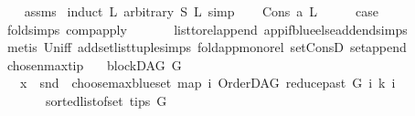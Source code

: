 \begin{isabellebody}
%
\isadelimproof
\ \ %
\endisadelimproof
%
\isatagproof
{}\isamarkupfalse%
\ assms\ \isanewline
{}\isamarkupfalse%
{\isacharparenleft}{\kern0pt}induct\ L{}\ arbitrary{\isacharcolon}{\kern0pt}\ S\ L{}{\isacharcomma}{\kern0pt}\ simp{\isacharparenright}{\kern0pt}\isanewline
\ \ \isamarkupfalse%
\ {\isacharparenleft}{\kern0pt}Cons\ a\ L{}{\isacharparenright}{\kern0pt}\isanewline
\ \ \isamarkupfalse%
\ \isamarkupfalse%
\ {\isacharquery}{\kern0pt}case\ \isanewline
\ \ \ \ \isamarkupfalse%
\ fold{\isachardot}{\kern0pt}simps{\isacharparenleft}{\kern0pt}{}{\isacharparenright}{\kern0pt}\ comp{\isacharunderscore}{\kern0pt}apply\ \isanewline
\ \ \ \ \isamarkupfalse%
\ list{\isacharunderscore}{\kern0pt}to{\isacharunderscore}{\kern0pt}rel{\isacharunderscore}{\kern0pt}append\ app{\isacharunderscore}{\kern0pt}if{\isacharunderscore}{\kern0pt}blue{\isacharunderscore}{\kern0pt}else{\isacharunderscore}{\kern0pt}add{\isacharunderscore}{\kern0pt}end{\isachardot}{\kern0pt}simps\isanewline
\ \ \ \ \isamarkupfalse%
\ {\isacharparenleft}{\kern0pt}metis\ Un{\isacharunderscore}{\kern0pt}iff\ add{\isacharunderscore}{\kern0pt}set{\isacharunderscore}{\kern0pt}list{\isacharunderscore}{\kern0pt}tuple{\isachardot}{\kern0pt}simps\ fold{\isacharunderscore}{\kern0pt}app{\isacharunderscore}{\kern0pt}mono{\isacharunderscore}{\kern0pt}rel\ set{\isacharunderscore}{\kern0pt}ConsD\ set{\isacharunderscore}{\kern0pt}append{\isacharparenright}{\kern0pt}\ \ \isanewline
{}\isamarkupfalse%
%
\endisatagproof
{\isafoldproof}%
%
\isadelimproof
\isanewline
%
\endisadelimproof
\isanewline
{}\isamarkupfalse%
\ chosen{\isacharunderscore}{\kern0pt}max{\isacharunderscore}{\kern0pt}tip{\isacharcolon}{\kern0pt}\isanewline
\ \ \ {\isachardoublequoteopen}blockDAG\ G{\isachardoublequoteclose}\isanewline
\ \ \ {\isachardoublequoteopen}x\ {\isacharequal}{\kern0pt}\ snd\ {\isacharparenleft}{\kern0pt}\ choose{\isacharunderscore}{\kern0pt}max{\isacharunderscore}{\kern0pt}blue{\isacharunderscore}{\kern0pt}set\ {\isacharparenleft}{\kern0pt}map\ {\isacharparenleft}{\kern0pt}{\isasymlambda}i{\isachardot}{\kern0pt}\ {\isacharparenleft}{\kern0pt}OrderDAG\ {\isacharparenleft}{\kern0pt}reduce{\isacharunderscore}{\kern0pt}past\ G\ i{\isacharparenright}{\kern0pt}\ k{\isacharcomma}{\kern0pt}\ i{\isacharparenright}{\kern0pt}{\isacharparenright}{\kern0pt}\isanewline
\ \ \ \ \ \ \ {\isacharparenleft}{\kern0pt}sorted{\isacharunderscore}{\kern0pt}list{\isacharunderscore}{\kern0pt}of{\isacharunderscore}{\kern0pt}set\ {\isacharparenleft}{\kern0pt}tips\ G{\isacharparenright}{\kern0pt}{\isacharparenright}{\kern0pt}{\isacharparenright}{\kern0pt}{\isacharparenright}{\kern0pt}{\isachardoublequoteclose}\ \isanewline

\end{isabellebody}
